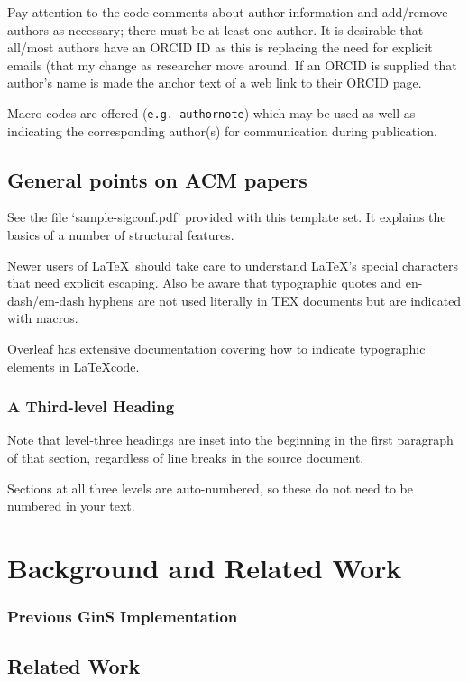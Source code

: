 \documentclass[sigconf]{acmart}
\begin{document}
Pay attention to the code comments about author information and add/remove authors as necessary; there must be at least one author. It is desirable that all/most authors have an ORCID ID as this is replacing the need for explicit emails (that my change as researcher move around. If an ORCID is supplied that author's name is made the anchor text of a web link to their ORCID page. 

Macro codes are offered (\texttt{e.g. authornote}) which may be used as well as indicating the corresponding author(s) for communication during publication.

\subsection{General points on ACM papers}
See the file `sample-sigconf.pdf' provided with this template set. It explains the basics of a number of structural features.

Newer users of \LaTeX\ should take care to understand \LaTeX's special characters that need explicit escaping. Also be aware that typographic quotes and en-dash/em-dash hyphens are not used literally in TEX documents but are indicated with macros.

Overleaf has extensive documentation covering how to indicate typographic elements in \LaTeX code.

\subsubsection{A Third-level Heading} 
Note that level-three headings are inset into the beginning in the first paragraph of that section, regardless of line breaks in the source document.

Sections at all three levels are auto-numbered, so these do not need to be numbered in your text.


\section{Background and Related Work}

\subsubsection{Previous GinS Implementation} 

\subsection{Related Work}
\end{document}
